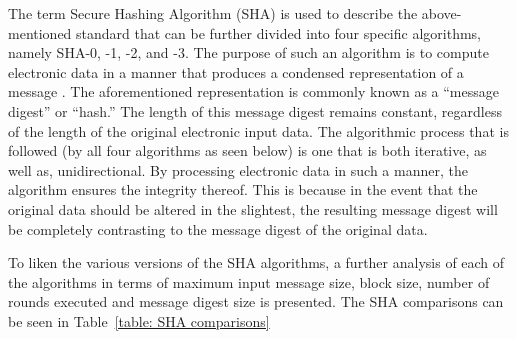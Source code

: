     The term Secure Hashing Algorithm (SHA) is used to describe the above-mentioned standard that can be further divided into four specific algorithms, namely SHA-0, -1, -2, and -3. The purpose of such an algorithm is to compute electronic data in a manner that produces a condensed representation of a message \citep{Foti2015}. The aforementioned representation is commonly known as a “message digest” or “hash.” The length of this message digest remains constant, regardless of the length of the original electronic input data. The algorithmic process that is followed (by all four algorithms as seen below) is one that is both iterative, as well as, unidirectional. By processing electronic data in such a manner, the algorithm ensures the integrity thereof. This is because in the event that the original data should be altered in the slightest, the resulting message digest will be completely contrasting to the message digest of the original data. 
    
    To liken the various versions of the SHA algorithms, a further analysis of each of the algorithms in terms of maximum input message size, block size, number of rounds executed and message digest size is presented. The SHA comparisons can be seen in Table~\ref{table: SHA comparisons}
    
    
